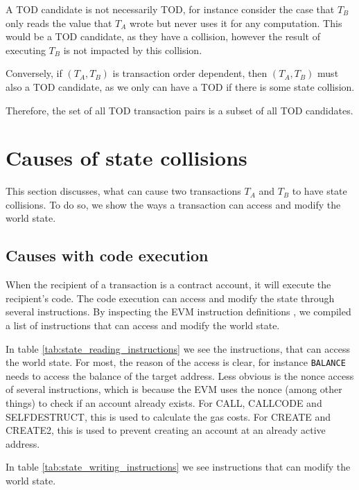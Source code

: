 \documentclass[draft,final]{vutinfth} %
\begin{document}
A TOD candidate is not necessarily TOD, for instance consider the case that $T_B$ only reads the value that $T_A$ wrote but never uses it for any computation. This would be a TOD candidate, as they have a collision, however the result of executing $T_B$ is not impacted by this collision.

Conversely, if $(T_A, T_B)$ is transaction order dependent, then $(T_A, T_B)$ must also a TOD candidate, as we only can have a TOD if there is some state collision.

Therefore, the set of all TOD transaction pairs is a subset of all TOD candidates.

\section{Causes of state collisions}

This section discusses, what can cause two transactions $T_A$ and $T_B$ to have state collisions. To do so, we show the ways a transaction can access and modify the world state.

\subsection{Causes with code execution}

When the recipient of a transaction is a contract account, it will execute the recipient's code. The code execution can access and modify the state through several instructions. By inspecting the EVM instruction definitions \cite[p.30-38]{wood_ethereum_2024}\cite{noauthor_evm_2024}, we compiled a list of instructions that can access and modify the world state.

In table \ref{tab:state_reading_instructions} we see the instructions, that can access the world state. For most, the reason of the access is clear, for instance \verb|BALANCE| needs to access the balance of the target address. Less obvious is the nonce access of several instructions, which is because the EVM uses the nonce (among other things) to check if an account already exists. For CALL, CALLCODE and SELFDESTRUCT, this is used to calculate the gas costs. For CREATE and CREATE2, this is used to prevent creating an account at an already active address. \cite{wood_ethereum_2024}

In table \ref{tab:state_writing_instructions} we see instructions that can modify the world state.
\end{document}
